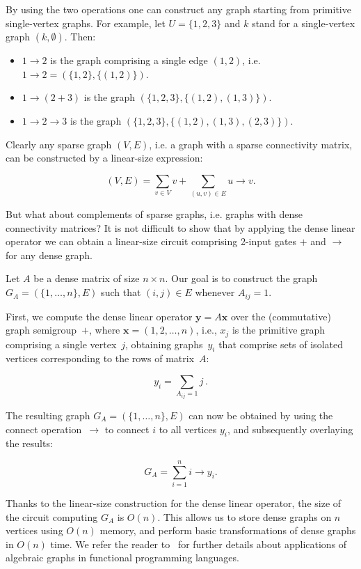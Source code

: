 \documentclass[11pt,letterpaper]{article}
\begin{document}
By using the two operations one can construct any graph starting from primitive
single-vertex graphs. For example, let $U=\{1,2,3\}$ and $k$ stand for a
single-vertex graph $({k}, \emptyset)$. Then:

\begin{itemize}
  \item $1 \rightarrow 2$ is the graph comprising a single edge $(1,2)$, i.e.
  $1 \rightarrow 2 = (\{1,2\}, \{(1,2)\})$.
  \item $1 \rightarrow (2 + 3)$ is the graph $(\{1,2,3\}, \{(1,2),(1,3)\})$.
  \item $1 \rightarrow 2 \rightarrow 3$ is the graph $(\{1,2,3\}, \{(1,2),(1,3),(2,3)\})$.
\end{itemize}

\noindent
Clearly any sparse graph $(V, E)$, i.e. a graph with a sparse connectivity
matrix, can be constructed by a linear-size expression:

\[
(V, E) = \sum_{v \in V} v + \sum_{(u,v) \in E} u \rightarrow v.
\]

\noindent
But what about complements of sparse graphs, i.e. graphs with dense
connectivity matrices? It is not difficult to show that by applying the dense
linear operator we can obtain a linear-size circuit comprising 2-input gates
$+$ and $\rightarrow$ for any dense graph.

Let $A$ be a dense matrix of size $n\times n$. Our goal is to construct the
graph $G_A = (\{1, \dots, n\}, E)$ such that $(i,j) \in E$ whenever $A_{ij}=1$.

First, we compute the dense linear operator $\mathbf{y} = A \mathbf{x}$ over the
(commutative) graph semigroup~$+$, where $\mathbf{x} = (1, 2, \dots, n)$, i.e.,
$x_j$ is the primitive graph comprising a single vertex~$j$, obtaining
graphs~$y_i$ that comprise sets of isolated vertices corresponding to the rows
of matrix~$A$:

\[
y_i = \sum_{A_{ij}=1} j \, .
\]

The resulting graph $G_A = (\{1, \dots, n\}, E)$ can now be obtained by using
the connect operation~$\rightarrow$ to connect $i$ to all vertices $y_i$, and
subsequently overlaying the results:

\[
G_A = \sum_{i=1}^{n} i \rightarrow y_i.
\]

Thanks to the linear-size construction for the dense linear operator, the size
of the circuit computing $G_A$ is $O(n)$. This allows us to store dense graphs
on $n$ vertices using $O(n)$ memory, and perform basic transformations of dense
graphs in $O(n)$ time. We refer the reader to~\cite{mokhov2017algebraic} for
further details about applications of algebraic graphs in functional programming
languages.
\end{document}
